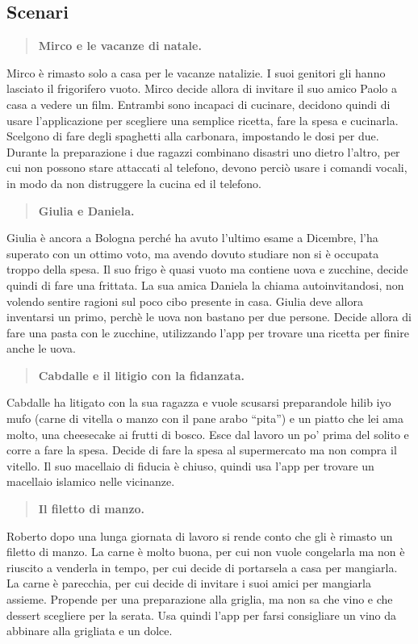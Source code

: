 \subsection{Scenari}
\begin{quote}
	\textbf{Mirco e le vacanze di natale.}
\end{quote}
Mirco è rimasto solo a casa per le vacanze natalizie. I suoi genitori gli hanno lasciato
il frigorifero vuoto. Mirco decide allora di invitare il suo amico Paolo a casa a
vedere un film. Entrambi sono incapaci di cucinare, decidono quindi di usare
l’applicazione per scegliere una semplice ricetta, fare la spesa e cucinarla.
Scelgono di fare degli spaghetti alla carbonara, impostando le dosi per due.
Durante la preparazione i due ragazzi combinano disastri uno dietro l’altro,
per cui non possono stare attaccati al telefono, devono perciò usare i comandi
vocali, in modo da non distruggere la cucina ed il telefono.

\begin{quote}
	\textbf{Giulia e Daniela.}
\end{quote}
Giulia è ancora a Bologna perché ha avuto l'ultimo esame a Dicembre,
l'ha superato con un ottimo voto, ma avendo dovuto studiare non si è occupata troppo
della spesa. Il suo frigo è quasi vuoto ma contiene uova e zucchine,
decide quindi di fare una frittata. La sua amica Daniela la chiama
autoinvitandosi, non volendo sentire ragioni sul poco cibo presente in casa.
Giulia deve allora inventarsi un primo, perchè le uova non bastano per due
persone. Decide allora di fare una pasta con le zucchine, utilizzando l'app per
trovare una ricetta per finire anche le uova.

\begin{quote}
	\textbf{Cabdalle e il litigio con la fidanzata.}
\end{quote}
Cabdalle ha litigato con la sua ragazza e vuole scusarsi preparandole
hilib iyo mufo (carne di vitella o manzo con il pane arabo “pita”) e un piatto
che lei ama molto, una cheesecake ai frutti di bosco. Esce dal lavoro un po'
prima del solito e corre a fare la spesa. Decide di fare la spesa al
supermercato ma non compra il vitello. Il suo macellaio di fiducia è chiuso,
quindi usa l’app per trovare un macellaio islamico nelle vicinanze.

\begin{quote}
	\textbf{Il filetto di manzo.}
\end{quote}
Roberto dopo una lunga giornata di lavoro si rende conto che gli è rimasto un
filetto di manzo. La carne è molto buona, per cui non vuole congelarla ma non è
riuscito a venderla in tempo, per cui decide di portarsela a casa per mangiarla.
La carne è parecchia, per cui decide di invitare i suoi amici per mangiarla assieme.
Propende per una preparazione alla griglia, ma non sa che vino e che dessert
scegliere per la serata. Usa quindi l’app per farsi consigliare un vino da
abbinare alla grigliata e un dolce.


